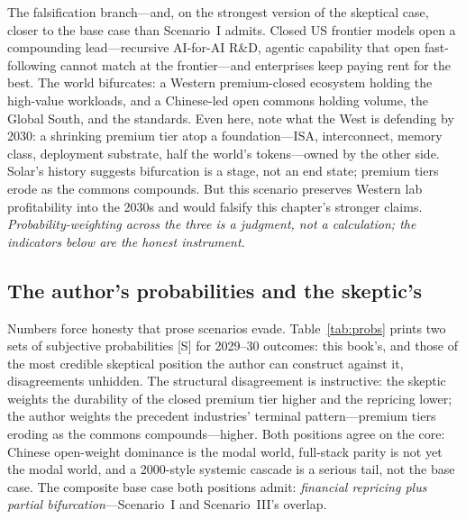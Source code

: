 The falsification branch---and, on the strongest version of the skeptical case, closer to the base case than Scenario~I admits. Closed US frontier models open a compounding lead---recursive AI-for-AI R\&D, agentic capability that open fast-following cannot match at the frontier---and enterprises keep paying rent for the best. The world bifurcates: a Western premium-closed ecosystem holding the high-value workloads, and a Chinese-led open commons holding volume, the Global South, and the standards. Even here, note what the West is defending by 2030: a shrinking premium tier atop a foundation---ISA, interconnect, memory class, deployment substrate, half the world's tokens---owned by the other side. Solar's history suggests bifurcation is a stage, not an end state; premium tiers erode as the commons compounds. But this scenario preserves Western lab profitability into the 2030s and would falsify this chapter's stronger claims. \emph{Probability-weighting across the three is a judgment, not a calculation; the indicators below are the honest instrument.}

\subsection{The author's probabilities and the skeptic's}

Numbers force honesty that prose scenarios evade. Table~\ref{tab:probs} prints two sets of subjective probabilities [S] for 2029--30 outcomes: this book's, and those of the most credible skeptical position the author can construct against it, disagreements unhidden. The structural disagreement is instructive: the skeptic weights the durability of the closed premium tier higher and the repricing lower; the author weights the precedent industries' terminal pattern---premium tiers eroding as the commons compounds---higher. Both positions agree on the core: Chinese open-weight dominance is the modal world, full-stack parity is not yet the modal world, and a 2000-style systemic cascade is a serious tail, not the base case. The composite base case both positions admit: \emph{financial repricing plus partial bifurcation}---Scenario~I and Scenario~III's overlap.

